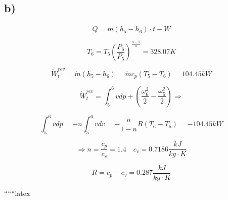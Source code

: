 

\subsection*{b)}

\[
Q = \dot{m} (h_5 - h_6) \cdot t - \dot{W}
\]

\[
T_6 = T_5 \left( \frac{P_6}{P_5} \right)^{\frac{n-1}{n}} = 328.07 K
\]

\[
\dot{W}_{t}^{rev} = \dot{m} (h_5 - h_6) = \dot{m} c_p (T_5 - T_6) = 104.45 kW
\]

\[
\dot{W}_{t}^{rev} = \int_{5}^{6} v dp + \left( \frac{\omega_6^2}{2} - \frac{\omega_5^2}{2} \right) \Rightarrow
\]

\[
\int_{5}^{6} v dp = -n \int_{5}^{6} v dv = -\frac{n}{1-n} R (T_6 - T_5) = -104.45 kW
\]

\[
\Rightarrow n = \frac{c_p}{c_v} = 1.4 \quad c_v = 0.7186 \frac{kJ}{kg \cdot K}
\]

\[
R = c_p - c_v = 0.287 \frac{kJ}{kg \cdot K}
\]

``````latex